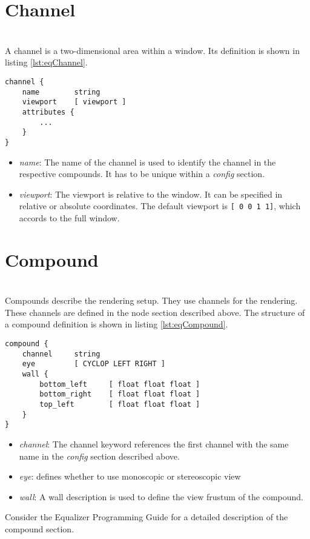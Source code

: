 \section{Channel}
\label{sec:eqChannel}\hfill\\
A channel is a two-dimensional area within a window. Its definition is shown in listing \ref{lst:eqChannel}.

\begin{lstlisting}[language=vrml,caption={Channel section in Equalizer configuration},label={lst:eqChannel}]
channel {
	name		string
	viewport	[ viewport ]
	attributes {
		...
	}
}
\end{lstlisting}

\begin{itemize}
	\item \emph{name}: The name of the channel is used to identify the channel in the respective compounds. It has to be unique within a \emph{config} section.
	\item \emph{viewport}: The viewport is relative to the window. It can be specified in relative or absolute coordinates. The default viewport is \texttt{[ 0 0 1 1]}, which accords to the full window.
\end{itemize}

\section{Compound}
\label{sec:eqCompound}\hfill\\
Compounds describe the rendering setup. They use channels for the rendering. These channels are defined in the node section described above. The structure of a compound definition is shown in listing \ref{lst:eqCompound}.
\begin{lstlisting}[language=vrml,caption={Compound section in Equalizer configuration},label={lst:eqCompound}]
compound {
	channel		string
	eye			[ CYCLOP LEFT RIGHT ]
	wall {
		bottom_left 	[ float float float ]
		bottom_right 	[ float float float ]
		top_left	 	[ float float float ]
	}
}
\end{lstlisting}

\begin{itemize}
	\item \emph{channel}: The channel keyword references the first channel with the same name in the \emph{config} section described above.
	\item \emph{eye}: defines whether to use monoscopic or stereoscopic view
	\item \emph{wall}: A wall description  is used to define the view frustum of the compound.  
\end{itemize}

Consider the Equalizer Programming Guide \cite[p. 68ff]{eqPG} for a detailed description of the compound section.